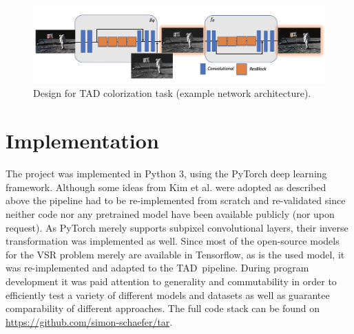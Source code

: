 \begin{figure}[!htbp]
    \centering
    \includegraphics[width=14cm]{figures/architecture_color_large.png}
    \caption{Design for \ac{TAD} colorization task (example network architecture).}
    \label{fig:architecture_color}
\end{figure}

\section{Implementation}
\label{sec:Approach_IMP}
The project was implemented in Python 3, using the PyTorch deep learning
framework. Although some ideas from Kim et al. \cite{TAID} were adopted as described above the pipeline had to be re-implemented from scratch and
re-validated since neither code nor any pretrained model have been
available publicly (nor upon request). As PyTorch merely supports
subpixel convolutional layers, their inverse transformation was implemented as well. Since most of the open-source models for the \ac{VSR} problem merely are available in Tensorflow, as is the used model, it was re-implemented and adapted to the \ac{TAD} pipeline.
\newline
During program development it was paid attention to generality and
commutability in order to efficiently test a variety of different models and datasets as well as guarantee comparability of different approaches. The full code stack can be found on \url{https://github.com/simon-schaefer/tar}.

